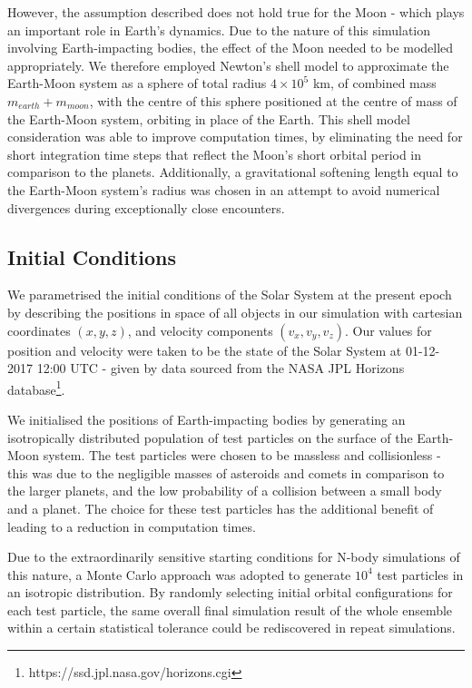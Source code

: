 However, the assumption described does not hold true for the Moon - which plays an important role in Earth's dynamics. Due to the nature of this simulation involving Earth-impacting bodies, the effect of the Moon needed to be modelled appropriately. We therefore employed Newton's shell model to approximate the Earth-Moon system as a sphere of total radius $4\times10^5$ km, of combined mass $m_{earth}+m_{moon}$, with the centre of this sphere positioned at the centre of mass of the Earth-Moon system, orbiting in place of the Earth. This shell model consideration was able to improve computation times, by eliminating the need for short integration time steps that reflect the Moon's short orbital period in comparison to the planets. Additionally, a gravitational softening length equal to the Earth-Moon system's radius was chosen in an attempt to avoid numerical divergences during exceptionally close encounters.

\subsection{Initial Conditions}

We parametrised the initial conditions of the Solar System at the present epoch by describing the positions in space of all objects in our simulation with cartesian coordinates $(x,y,z)$, and velocity components $(v_x, v_y, v_z)$. Our values for position and velocity were taken to be the state of the Solar System at 01-12-2017 12:00 UTC - given by data sourced from the NASA JPL Horizons database\footnote{https://ssd.jpl.nasa.gov/horizons.cgi}.

We initialised the positions of Earth-impacting bodies by generating an isotropically distributed population of test particles on the surface of the Earth-Moon system. The test particles were chosen to be massless and collisionless -  this was due to the negligible masses of asteroids and comets in comparison to the larger planets, and the low probability of a collision between a small body and a planet. The choice for these test particles has the additional benefit of leading to a reduction in computation times.

Due to the extraordinarily sensitive starting conditions for N-body simulations of this nature, a Monte Carlo approach was adopted to generate $10^4$ test particles in an isotropic distribution. By randomly selecting initial orbital configurations for each test particle, the same overall final simulation result of the whole ensemble within a certain statistical tolerance could be rediscovered in repeat simulations.

